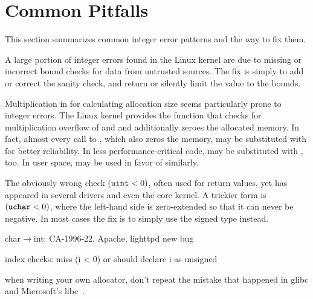 \section{Common Pitfalls}
\label{s:common}

This section summarizes common integer error patterns and the way
to fix them.

A large portion of integer errors found in the Linux kernel are
due to missing or incorrect bound checks for data from untrusted
sources.  The fix is simply to add or correct the sanity check,
and return  or silently limit the value to the bounds.

Multiplication in for calculating allocation size seems particularly
prone to integer errors.  The Linux kernel provides the function
 that checks for multiplication overflow
of  and  and additionally zeroes the allocated
memory.  In fact, almost every call to ,
which also zeros the memory, may be substituted with 
for better reliability.  In less performance-critical code,
 may be substituted with , too.  In user
space,  may be used in favor of  similarly.

The obviously wrong check $(\texttt{uint} < 0)$, often used for return
values, yet has appeared in several drivers and even the core kernel.
A trickier form is $(\texttt{uchar} < 0)$, where the left-hand side is
zero-extended so that it can never be negative.  In most cases the
fix is to simply use the signed type instead.

char$\to$int: 
CA-1996-22,
Apache,
lighttpd new bug


index checks:
miss (i < 0) or should declare i as unsigned



when writing your own allocator, don't repeat the mistake that
happened in glibc and Microsoft's libc~\cite{rus-cert:calloc}.
